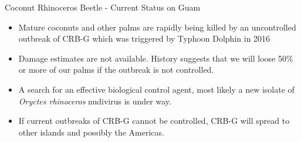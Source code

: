 \documentclass[]{beamer}
\begin{document}

\begin{frame}{Coconut Rhinoceros Beetle - Current Status on Guam}
	\begin{itemize}
		\item Mature coconuts and other palms are rapidly being killed by an uncontrolled outbreak of CRB-G which was triggered by Typhoon Dolphin in 2016
		\item Damage estimates are not available. History suggests that we will loose 50\% or more of our palms if the outbreak is not controlled.
		\item A search for an effective biological control agent, most likely a new isolate of \textit{Oryctes rhinoceros} nudivirus is under way.
		\item If current outbreaks of CRB-G cannot be controlled, CRB-G will spread to other islands and possibly the Americas.
	\end{itemize}
\end{frame}


%
%
\end{document}
